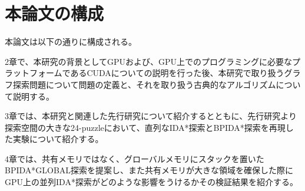 \documentclass[a4paper,11pt,oneside,openany]{jsbook}
\begin{document}






\section{本論文の構成}
本論文は以下の通りに構成される。

2章で、本研究の背景としてGPUおよび、GPU上でのプログラミングに必要なプラットフォームであるCUDAについての説明を行った後、本研究で取り扱うグラフ探索問題について問題の定義と、それを取り扱う古典的なアルゴリズムについて説明する。

3章では、本研究と関連した先行研究について紹介するとともに、先行研究より探索空間の大きな24-puzzleにおいて、直列なIDA*探索とBPIDA*探索を再現した実験について紹介する。

4章では、共有メモリではなく、グローバルメモリにスタックを置いたBPIDA*GLOBAL探索を提案し、また共有メモリが大きな領域を確保した際にGPU上の並列IDA*探索がどのような影響をうけるかその検証結果を紹介する。
\end{document}
